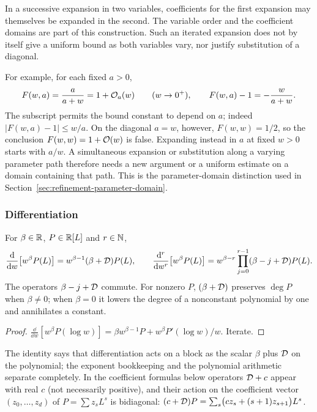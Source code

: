 In a successive expansion in two variables, coefficients for the first
expansion may themselves be expanded in the second. The variable order
and the coefficient domains are part of this construction. Such an
iterated expansion does not by itself give a uniform bound as both
variables vary, nor justify substitution of a diagonal.

For example, for each fixed $a>0$,
\[
 F(w,a)=\frac{a}{a+w}=1+\mathcal O_a(w)\qquad(w\to0^+),
 \qquad F(w,a)-1=-\frac{w}{a+w}.
\]
The subscript permits the bound constant to depend on $a$; indeed
$|F(w,a)-1|\le w/a$. On the diagonal $a=w$, however,
$F(w,w)=1/2$, so the conclusion $F(w,w)=1+\mathcal O(w)$ is false.
Expanding instead in $a$ at fixed $w>0$ starts with $a/w$.
A simultaneous expansion or substitution along a varying parameter path
therefore needs a new argument or a uniform estimate on a domain
containing that path. This is the parameter-domain distinction used in
Section~\ref{sec:refinement-parameter-domain}.

\subsubsection*{Differentiation}

\begin{lemma}
\label{lem:euler}
For $\beta\in\mathbb R$, $P\in\mathbb R[L]$ and $r\in\mathbb N$,
\begin{equation}
 \frac{\mathrm d}{\mathrm d w}\bigl[w^\beta P(L)\bigr]=w^{\beta-1}(\beta+\mathcal D)P(L),\qquad
 \frac{\mathrm d^r}{\mathrm d w^r}\bigl[w^\beta P(L)\bigr]=w^{\beta-r}\prod_{j=0}^{r-1}(\beta-j+\mathcal D)P(L).
 \label{eq:euler}
\end{equation}
The operators $\beta-j+\mathcal D$ commute. For nonzero $P$, $(\beta+\mathcal D)$
preserves $\deg P$ when $\beta\ne0$; when $\beta=0$ it lowers the
degree of a nonconstant polynomial by one and annihilates a constant.
\end{lemma}
\begin{proof}
$\frac{\dd}{\dd w}[w^\beta P(\log w)]=\beta w^{\beta-1}P+w^\beta P'(\log w)/w$. Iterate.
\end{proof}

The identity says that differentiation acts on a block as the scalar $\beta$ plus $\mathcal D$ on the polynomial; the exponent bookkeeping and the polynomial arithmetic separate completely. In the coefficient formulas below operators $\mathcal D+c$ appear with real $c$ (not necessarily positive), and their action on the coefficient vector $(z_0,\dots,z_d)$ of $P=\sum z_sL^s$ is bidiagonal: $(c+\mathcal D)P=\sum_s\bigl(cz_s+(s+1)z_{s+1}\bigr)L^s$.

